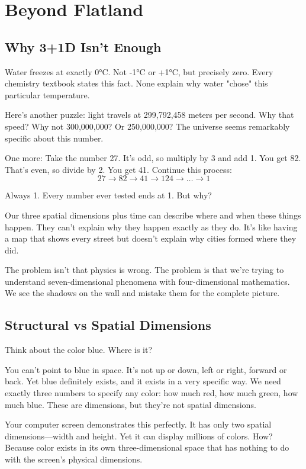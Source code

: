 
\chapter{Beyond Flatland}

\section{Why 3+1D Isn't Enough}

Water freezes at exactly 0°C. Not -1°C or +1°C, but precisely zero. Every chemistry textbook states this fact. None explain why water "chose" this particular temperature.

Here's another puzzle: light travels at 299,792,458 meters per second. Why that speed? Why not 300,000,000? Or 250,000,000? The universe seems remarkably specific about this number.

One more: Take the number 27. It's odd, so multiply by 3 and add 1. You get 82. That's even, so divide by 2. You get 41. Continue this process:
\[
27 \rightarrow 82 \rightarrow 41 \rightarrow 124 \rightarrow \dots \rightarrow 1
\]

Always 1. Every number ever tested ends at 1. But why?

Our three spatial dimensions plus time can describe where and when these things happen. They can't explain why they happen exactly as they do. It's like having a map that shows every street but doesn't explain why cities formed where they did.

The problem isn't that physics is wrong. The problem is that we're trying to understand seven-dimensional phenomena with four-dimensional mathematics. We see the shadows on the wall and mistake them for the complete picture.

\section{Structural vs Spatial Dimensions}

Think about the color blue. Where is it?

You can't point to blue in space. It's not up or down, left or right, forward or back. Yet blue definitely exists, and it exists in a very specific way. We need exactly three numbers to specify any color: how much red, how much green, how much blue. These are dimensions, but they're not spatial dimensions.

Your computer screen demonstrates this perfectly. It has only two spatial dimensions—width and height. Yet it can display millions of colors. How? Because color exists in its own three-dimensional space that has nothing to do with the screen's physical dimensions.

